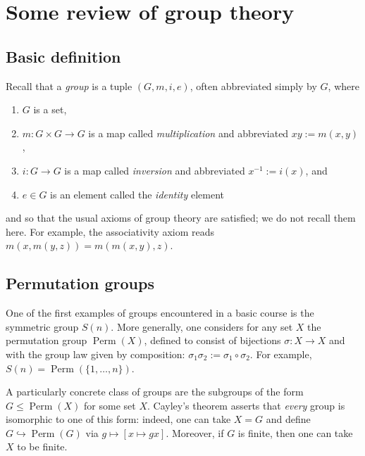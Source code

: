 \documentclass[reqno]{amsart} 
\begin{document}
\section{Some review of group theory}
\label{sec:orgaef96e9}
\subsection{Basic definition}
\label{sec:orgd7903af}
Recall that a \emph{group}
is a tuple $(G,m,i,e)$, often abbreviated simply by $G$,
where
\begin{enumerate}
\item $G$ is a set,
\item $m : G \times G \rightarrow G$ is a map
  called \emph{multiplication}
  and abbreviated $x y := m(x,y)$,
\item $i : G \rightarrow G$
  is a map called \emph{inversion}
  and abbreviated $x^{-1} := i(x)$,
  and
\item $e \in G$ is an element called the \emph{identity} element
\end{enumerate}
and so that the usual axioms of group theory
are satisfied; we do not recall them here.
For example, the associativity axiom reads
$m(x,m(y,z)) = m(m(x,y),z)$.

\subsection{Permutation groups}
\label{sec:orgcf966cd}
One of the first examples of groups
encountered in a basic course
is the symmetric group $S(n)$.
More generally,
one considers for any set $X$
the permutation group $\operatorname{Perm}(X)$,
defined to consist of bijections $\sigma : X \rightarrow X$
and with the group law given by composition:
$\sigma_1 \sigma_2 := \sigma_1 \circ \sigma_2$.
For example, $S(n) = \operatorname{Perm}(\{1,\dotsc,n\})$.

A particularly concrete class of groups
are the subgroups of the form $G \leq \operatorname{Perm}(X)$
for some set $X$.
Cayley's theorem
asserts that \emph{every} group is isomorphic
to one of this form:
indeed, one can take $X = G$
and define $G \hookrightarrow \operatorname{Perm}(G)$
via $g \mapsto [x \mapsto g x]$.
Moreover, if $G$ is finite, then one can take $X$ to be finite.
\end{document}

